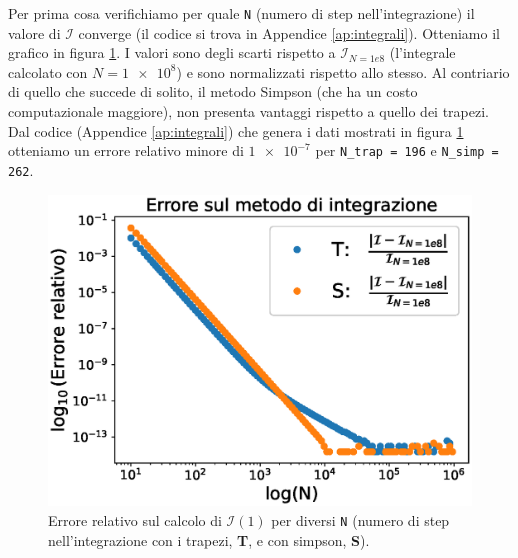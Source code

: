 \documentclass[a4paper, titlepage]{article}
\begin{document}
Per prima cosa verifichiamo per quale \texttt{N} (numero di step
nell'integrazione) il valore di $\mathcal{I}$ converge (il codice si trova in
Appendice \ref{ap:integrali}).
Otteniamo il grafico in figura \ref{fig:Pot_cvgN}.
I valori sono degli scarti rispetto a $\mathcal{I}_{N = 1e8}$ (l'integrale
calcolato con $N = \num{1e8}$) e sono normalizzati rispetto allo stesso.
Al contriario di quello che succede di solito, il metodo Simpson (che ha un
costo computazionale maggiore), non presenta vantaggi rispetto a quello dei
trapezi.
Dal codice (Appendice \ref{ap:integrali}) che genera i dati mostrati in figura
\ref{fig:Pot_cvgN} otteniamo un errore relativo minore di $\num{1e-7}$ per
\texttt{N\_trap = 196} e \texttt{N\_simp = 262}.
\begin{figure}[h]
    \begin{minipage}{0.49 \textwidth}
        \centering
        \includegraphics[width = \textwidth]{Figures/Pot_cvgN.eps}
        \caption{Errore relativo sul calcolo di $\mathcal I(1)$ per diversi
        \texttt{N} (numero di step nell'integrazione con i trapezi, \textbf{T},
        e con simpson, \textbf{S}).  \\ \\}
        \label{fig:Pot_cvgN}
    \end{minipage}
    \hspace{0.01 \textwidth}
    \begin{minipage}{0.49 \textwidth}
        \centering

\end{minipage}
\end{figure}
\end{document}
